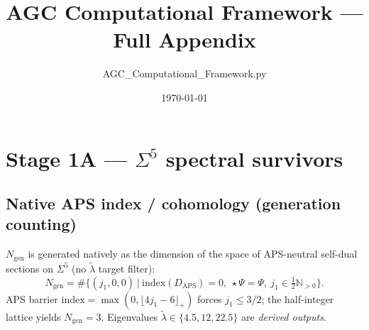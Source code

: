 \documentclass{article}
\title{AGC Computational Framework --- Full Appendix}
\author{AGC\_Computational\_Framework.py}
\date{\today}
\begin{document}
\maketitle

\section{Stage 1A --- $\Sigma^5$ spectral survivors}
\subsection{Native APS index / cohomology (generation counting)}
$N_{\mathrm{gen}}$ is generated natively as the dimension of the space of
APS-neutral self-dual sections on $\Sigma^5$ (no $\tilde\lambda$ target filter):
\begin{equation}
N_{\mathrm{gen}}
= \#\big\{(j_1,0,0)\ \big|\ 
  \mathrm{index}(D_{\mathrm{APS}})=0,\ 
  \star\Psi=\Psi,\ 
  j_1\in\tfrac12\mathbb{N}_{>0}\big\}.
\end{equation}
APS barrier $\mathrm{index}=\max(0,\lfloor 4j_1-6\rfloor_+)$ forces $j_1\le 3/2$;
the half-integer lattice yields $N_{\mathrm{gen}}=3$. Eigenvalues
$\tilde\lambda\in\{4.5,12,22.5\}$ are \emph{derived outputs}.
\end{document}
